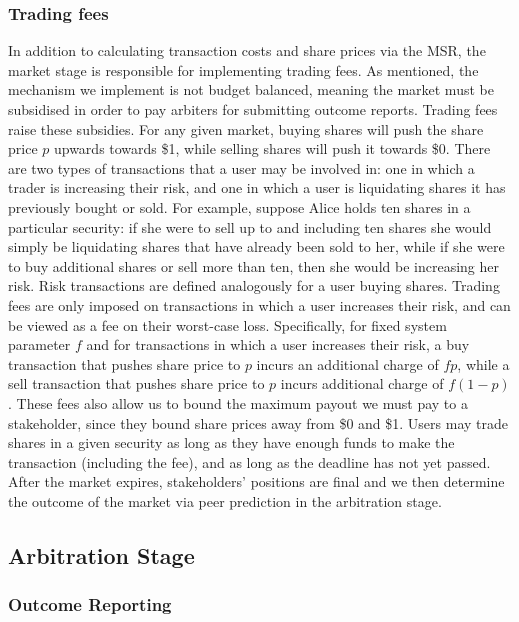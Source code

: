 \subsubsection{Trading fees}

In addition to calculating transaction costs and share prices via the MSR, the
market stage is responsible for implementing trading fees. As mentioned, the
mechanism we implement is not budget balanced, meaning the market must be
subsidised in order to pay arbiters for submitting outcome reports. Trading
fees raise these subsidies. For any given market, buying shares will push the
share price $p$ upwards towards \$1, while selling shares will push it towards
\$0. There are two types of transactions that a user may be involved in: one in
which a trader is increasing their risk, and one in which a user is liquidating
shares it has previously bought or sold. For example, suppose Alice holds ten
shares in a particular security: if she were to sell up to and including ten
shares she would simply be liquidating shares that have already been sold to
her, while if she were to buy additional shares or sell more than ten, then she
would be increasing her risk. Risk transactions are defined analogously for a
user buying shares. Trading fees are only imposed on transactions in which a
user increases their risk, and can be viewed as a fee on their worst-case loss.
Specifically, for fixed system parameter $f$ and for transactions in which a
user increases their risk, a buy transaction that pushes share price to $p$
incurs an additional charge of $fp$, while a sell transaction that pushes share
price to $p$ incurs additional charge of $f(1-p)$. These fees also allow us to
bound the maximum payout we must pay to a stakeholder, since they bound share
prices away from \$0 and \$1. Users may trade shares in a given security as
long as they have enough funds to make the transaction (including the fee), and
as long as the deadline has not yet passed. After the market expires,
stakeholders' positions are final and we then determine the outcome of the
market via peer prediction in the arbitration stage.

\subsection{Arbitration Stage}

\subsubsection{Outcome Reporting}

